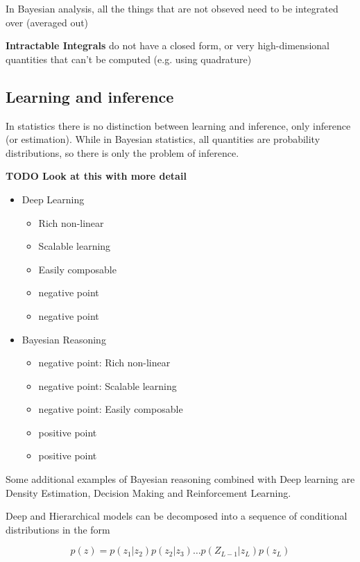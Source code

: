 \documentclass[b5paper]{report}
\begin{document}
In Bayesian analysis, all the things that are not obseved need to be integrated
over (averaged out)

\textbf{Intractable Integrals} do not have a closed form, or very
high-dimensional quantities that can't be computed (e.g. using quadrature)

\subsection{Learning and inference}

In statistics there is no distinction between learning and inference, only
inference (or estimation). While in Bayesian statistics, all quantities are
probability distributions, so there is only the problem of inference.

\textbf{TODO Look at this with more detail}

\begin{itemize}
  \item Deep Learning
    \begin{itemize}
      \item Rich non-linear
      \item Scalable learning
      \item Easily composable
      \item negative point
      \item negative point
    \end{itemize}
  \item Bayesian Reasoning
    \begin{itemize}
      \item negative point: Rich non-linear
      \item negative point: Scalable learning
      \item negative point: Easily composable
      \item positive point
      \item positive point
    \end{itemize}
\end{itemize}

Some additional examples of Bayesian reasoning combined with Deep learning are
Density Estimation, Decision Making and Reinforcement Learning.

Deep and Hierarchical models can be decomposed into a sequence of conditional
distributions in the form

\begin{equation}
  p(z) = p(z_1|z_2)p(z_2|z_3) \dots p(Z_{L-1}|z_L)p(z_L)
\end{equation}
\end{document}

